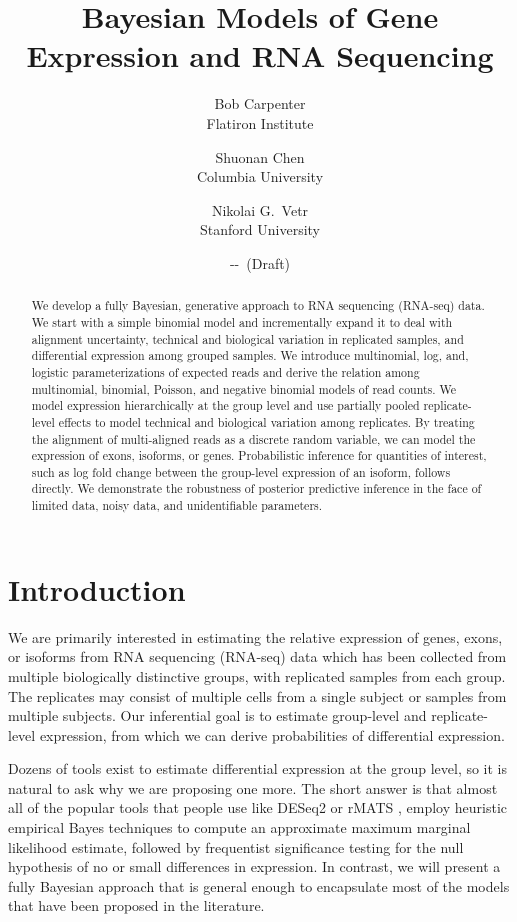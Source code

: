 \documentclass[11pt]{report}
\title{Bayesian Models of Gene Expression and RNA Sequencing}
\author{Bob Carpenter \\ Flatiron Institute
  \and Shuonan Chen \\ Columbia University
  \and Nikolai G.\ Vetr \\ Stanford University}
\date{\the\year-\the\month-\the\day \ (Draft)}
\begin{document}
\maketitle

\begin{abstract}
  \noindent
  We develop a fully Bayesian, generative approach to RNA sequencing
  (RNA-seq) data.  We start with a simple binomial model and
  incrementally expand it to deal with alignment uncertainty, technical
  and biological variation in replicated samples, and differential
  expression among grouped samples.  We introduce multinomial, log, and,
  logistic parameterizations of expected reads and derive the relation
  among multinomial, binomial, Poisson, and negative binomial models of
  read counts. We model expression hierarchically at the group level and
  use partially pooled replicate-level effects to model technical and
  biological variation among replicates.  By treating the alignment of
  multi-aligned reads as a discrete random variable, we can model the
  expression of exons, isoforms, or genes.  Probabilistic inference for
  quantities of interest, such as log fold change between the
  group-level expression of an isoform, follows directly.  We
  demonstrate the robustness of posterior predictive inference in the
  face of limited data, noisy data, and unidentifiable parameters.
\end{abstract}

\tableofcontents

\chapter{Introduction}

We are primarily interested in estimating the relative expression of
genes, exons, or isoforms from RNA sequencing (RNA-seq) data which has
been collected from multiple biologically distinctive groups, with
replicated samples from each group.  The replicates may consist of
multiple cells from a single subject or samples from multiple
subjects.  Our inferential goal is to estimate group-level and
replicate-level expression, from which we can derive probabilities of
differential expression.

Dozens of tools exist to estimate differential expression at the group
level, so it is natural to ask why we are proposing one more.  The
short answer is that almost all of the popular tools that people use
like DESeq2 \citep{love2014differential} or rMATS \citep
{shen2014rmats}, employ heuristic empirical Bayes techniques to
compute an approximate maximum marginal likelihood estimate, followed
by frequentist significance testing for the null hypothesis of no or
small differences in expression.  In contrast, we will present a fully
Bayesian approach that is general enough to encapsulate most of the
models that have been proposed in the literature.
\end{document}
